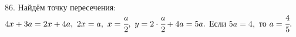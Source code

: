 86. Найдём точку пересечения: $4x+3a=2x+4a,\ 2x=a,\ x=\cfrac{a}{2},\ y=2\cdot\cfrac{a}{2}+4a=5a.$ Если $5a=4,$ то $a=\cfrac{4}{5}.$\\
